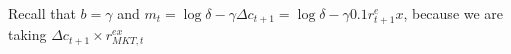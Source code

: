 Recall that $b = \gamma$ and $m_t = \log \delta - \gamma \Delta c_{t+1} = \log \delta-\gamma 0.1 r_{t+1}^ex$, because we are taking $\Delta c_{t+1}\times r^{ex}_{MKT,t}$ 